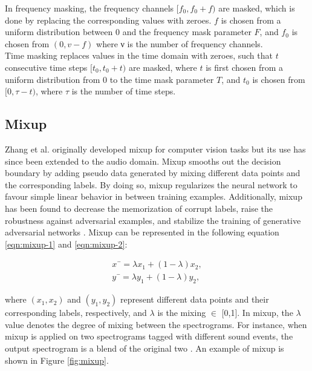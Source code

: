  In frequency masking, the frequency channels \([f_0, f_0 + f)\) are masked, which is done by replacing the corresponding values with zeroes. \(f\) is chosen from a uniform distribution between 0 and the frequency mask parameter \(F\), and \(f_0\) is chosen from \((0, v - f)\) where ν is the number of frequency channels. \\

Time masking replaces values in the time domain with zeroes, such that \(t\) consecutive time steps \([t_0, t_0 + t)\) are masked, where \(t\) is first chosen from a uniform distribution from 0 to the time mask parameter \(T\), and \(t_0\) is chosen from \([0, \tau - t)\), where \(\tau\) is the number of time steps.

\subsection{Mixup}
Zhang et al. \cite{mixup} originally developed mixup for computer vision tasks but its use has since been extended to the audio domain. Mixup smooths out the decision boundary by adding pseudo data generated by mixing different data points and the corresponding labels. By doing so, mixup regularizes the neural network to favour simple linear behavior in between training examples. Additionally, mixup has been found to decrease the memorization of corrupt labels, raise the robustness against adversarial examples, and stabilize the training of generative adversarial networks \cite{thulasidasan2020mixup}. Mixup can be represented in the following equation \ref{eqn:mixup-1} and \ref{eqn:mixup-2}:

\begin{align}
\label{eqn:mixup-1}
x¯ = \lambda{x_1} + (1 - \lambda)x_2,\\
\label{eqn:mixup-2}
y¯ = \lambda{y_1}+ (1 - \lambda)y_2,
\end{align}

where \((x_1, x_2)\) and \((y_1, y_2)\) represent different data points and their corresponding labels, respectively, and \(\lambda\) is the mixing \(\in\) [0,1]. In mixup, the \(\lambda\) value denotes the degree of mixing between the spectrograms. For instance, when mixup is applied on two spectrograms tagged with different sound events, the output spectrogram is a blend of the original two \cite{mixup_ex}. An example of mixup is shown in Figure \ref{fig:mixup}.


